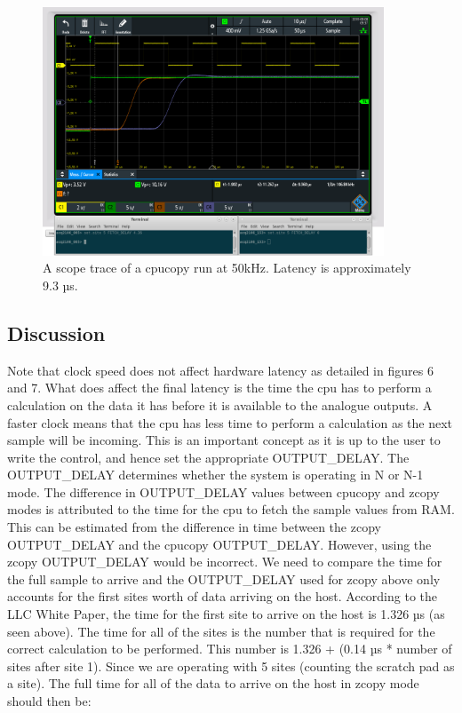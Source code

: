 \documentclass{article}
\begin{document}
\begin{figure}
	\centering
	\includegraphics[width=4.0in]{images/50kHz_annotated_scope_cpucopy.png}
	\caption{A scope trace of a cpucopy run at 50kHz. Latency is approximately 9.3 µs.}
	\label{}
\end{figure}

\subsection{Discussion}
Note that clock speed does not affect hardware latency as detailed in figures 6 and 7.
What does affect the final latency is the time the cpu has to perform a calculation on the data it has before it is available to the analogue outputs.
A faster clock means that the cpu has less time to perform a calculation as the next sample will be incoming.
This is an important concept as it is up to the user to write the control, and hence set the appropriate OUTPUT\_DELAY.
The OUTPUT\_DELAY determines whether the system is operating in N or N-1 mode.
The difference in OUTPUT\_DELAY values between cpucopy and zcopy modes is attributed to the time for the cpu to fetch the sample values from RAM.
This can be estimated from the difference in time between the zcopy OUTPUT\_DELAY and the cpucopy OUTPUT\_DELAY.
However, using the zcopy OUTPUT\_DELAY would be incorrect.
We need to compare the time for the full sample to arrive and the OUTPUT\_DELAY used for zcopy above only accounts for the first sites worth of data arriving on the host.
According to the LLC White Paper, the time for the first site to arrive on the host is 1.326 µs (as seen above).
The time for all of the sites is the number that is required for the correct calculation to be performed.
This number is 1.326 + (0.14 µs * number of sites after site 1). Since we are operating with 5 sites (counting the scratch pad as a site).
The full time for all of the data to arrive on the host in zcopy mode should then be:
\end{document}
